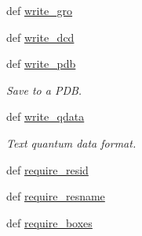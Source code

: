 \begin{DoxyCompactItemize}
\item 
def \hyperlink{classforcebalance_1_1molecule_1_1Molecule_a503eae2cee228e4cc5fc736504714925}{write\-\_\-gro}
\item 
def \hyperlink{classforcebalance_1_1molecule_1_1Molecule_a0dee435704418bf51199d6bab6d92249}{write\-\_\-dcd}
\item 
def \hyperlink{classforcebalance_1_1molecule_1_1Molecule_a47082443566cd50add3f2ec20af9cc10}{write\-\_\-pdb}
\begin{DoxyCompactList}\small\item\em Save to a P\-D\-B. \end{DoxyCompactList}\item 
def \hyperlink{classforcebalance_1_1molecule_1_1Molecule_a1ef6aefd3218f8ab3f9dc2b37e602fbf}{write\-\_\-qdata}
\begin{DoxyCompactList}\small\item\em Text quantum data format. \end{DoxyCompactList}\item 
def \hyperlink{classforcebalance_1_1molecule_1_1Molecule_a90fe456919fda305703e36af389e60e1}{require\-\_\-resid}
\item 
def \hyperlink{classforcebalance_1_1molecule_1_1Molecule_ad47d05a3ea76e013a628bd7b25ae3050}{require\-\_\-resname}
\item 
def \hyperlink{classforcebalance_1_1molecule_1_1Molecule_a03af3cfb99ea8f1c8c7e93d04bdcf967}{require\-\_\-boxes}
\end{DoxyCompactItemize}
